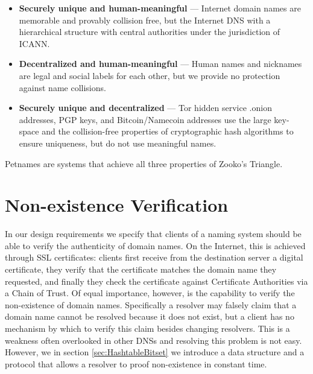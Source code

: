 \begin{itemize}
	\item \textbf{Securely unique and human-meaningful} --- Internet domain names are memorable and provably collision free, but the Internet DNS with a hierarchical structure with central authorities under the jurisdiction of ICANN.
	\item \textbf{Decentralized and human-meaningful} --- Human names and nicknames are legal and social labels for each other, but we provide no protection against name collisions.
	\item \textbf{Securely unique and decentralized} --- Tor hidden service .onion addresses, PGP keys, and Bitcoin/Namecoin addresses use the large key-space and the collision-free properties of cryptographic hash algorithms to ensure uniqueness, but do not use meaningful names.
\end{itemize}

Petnames are systems that achieve all three properties of Zooko's Triangle.


\section{Non-existence Verification}

In our design requirements we specify that clients of a naming system should be able to verify the authenticity of domain names. On the Internet, this is achieved through SSL certificates: clients first receive from the destination server a digital certificate, they verify that the certificate matches the domain name they requested, and finally they check the certificate against Certificate Authorities via a Chain of Trust. Of equal importance, however, is the capability to verify the non-existence of domain names. Specifically a resolver may falsely claim that a domain name cannot be resolved because it does not exist, but a client has no mechanism by which to verify this claim besides changing resolvers. This is a weakness often overlooked in other DNSs and resolving this problem is not easy. However, we in section \ref{sec:HashtableBitset} we introduce a data structure and a protocol that allows a resolver to proof non-existence in constant time.
